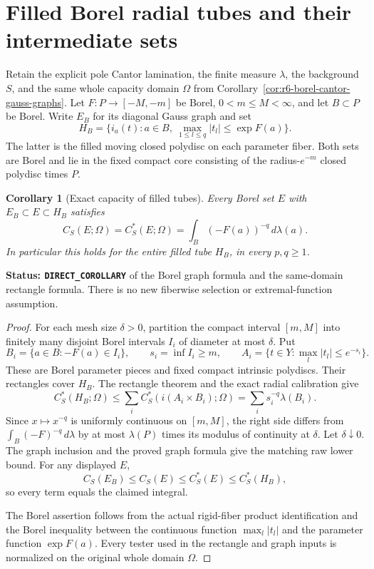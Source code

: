 \documentclass[11pt,a4paper]{article}
\numberwithin{equation}{section}
\newtheorem{corollary}[theorem]{Corollary}
\theoremstyle{definition}
\theoremstyle{remark}
\begin{document}


\section{Filled Borel radial tubes and their intermediate sets}
\label{sec:r6-laminar-borel-tubes}

Retain the explicit pole Cantor lamination, the finite measure $\lambda$,
the background $S$, and the same whole capacity domain $\Omega$ from
Corollary~\ref{cor:r6-borel-cantor-gauss-graphs}. Let
$F:P\to[-M,-m]$ be Borel, $0<m\le M<\infty$, and let $B\subset P$
be Borel. Write $E_B$ for its diagonal Gauss graph and set
\[
 H_B=\{i_a(t):a\in B,\ \max_{1\le l\le q}|t_l|
                                      \le\exp F(a)\}.
\]
The latter is the filled moving closed polydisc on each parameter
fiber. Both sets are Borel and lie in the fixed compact core consisting
of the radius-$e^{-m}$ closed polydisc times $P$.

\begin{corollary}[Exact capacity of filled tubes]
\label{cor:r6-filled-borel-radial-tubes}
Every Borel set $E$ with $E_B\subset E\subset H_B$ satisfies
\[
                 C_S(E;\Omega)=C_S^*(E;\Omega)
                       =\int_B(-F(a))^{-q}\,d\lambda(a).
\]
In particular this holds for the entire filled tube $H_B$, in every
$p,q\ge1$.
\end{corollary}

\noindent\textbf{Status: \texttt{DIRECT\_COROLLARY}} of the
Borel graph formula and the same-domain rectangle formula. There is
no new fiberwise selection or extremal-function assumption.

\begin{proof}
For each mesh size $\delta>0$, partition the compact interval $[m,M]$
into finitely many disjoint Borel intervals $I_i$ of diameter at most
$\delta$. Put
\[
 B_i=\{a\in B:-F(a)\in I_i\},\qquad s_i=\inf I_i\ge m,
 \qquad A_i=\{t\in Y:\max_l|t_l|\le e^{-s_i}\}.
\]
These are Borel parameter pieces and fixed compact intrinsic
polydiscs. Their rectangles cover $H_B$. The rectangle theorem and
the exact radial calibration give
\[
 C_S^*(H_B;\Omega)
       \le\sum_i C_S^*(i(A_i\times B_i);\Omega)
       =\sum_i s_i^{-q}\lambda(B_i).
\]
Since $x\mapsto x^{-q}$ is uniformly continuous on $[m,M]$, the
right side differs from $\int_B(-F)^{-q}\,d\lambda$ by at most
$\lambda(P)$ times its modulus of continuity at $\delta$. Let
$\delta\downarrow0$. The graph inclusion and the proved graph
formula give the matching raw lower bound. For any displayed $E$,
\[
 C_S(E_B)\le C_S(E)\le C_S^*(E)\le C_S^*(H_B),
\]
so every term equals the claimed integral.

The Borel assertion follows from the actual rigid-fiber product
identification and the Borel inequality between the continuous
function $\max_l|t_l|$ and the parameter function $\exp F(a)$.
Every tester used in the rectangle and graph inputs is normalized on
the original whole domain $\Omega$.
\end{proof}
\end{document}
